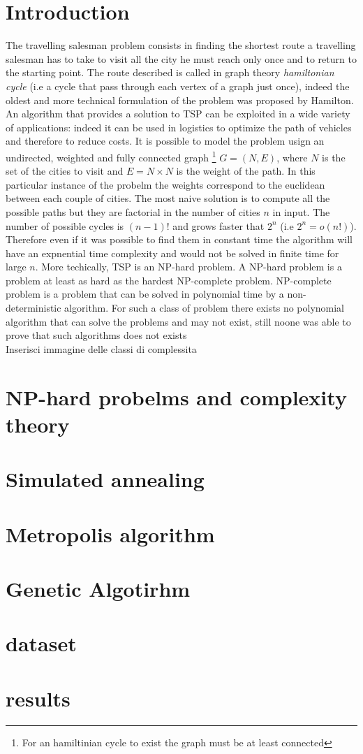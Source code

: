 \documentclass{article}
\begin{document}
\section{Introduction}
The travelling salesman problem consists in finding the shortest route a travelling salesman has to take to visit all the city he must reach only once and to return to the starting point. The route described is called in graph theory \textit{hamiltonian cycle} (i.e a cycle that pass through each vertex of a graph just once), indeed the oldest and more technical formulation of the problem was proposed by Hamilton. \\
An algorithm that provides a solution to TSP can be exploited in a wide variety of applications: indeed it can be used in logistics to optimize the path of vehicles and therefore to reduce costs.
It is possible to model the problem usign an undirected, weighted and fully connected graph \footnote{For an hamiltinian cycle to exist the graph must be at least connected} $G = (N,E)$, where $N$ is the set of the cities to visit and $E =  N \times N$ is the weight of the path. In this particular instance of the probelm the weights correspond to the euclidean between each couple of cities.
The most naive solution is to compute all the possible paths but they are factorial in the number of cities $n$ in input. The number of possible cycles is $(n-1)!$ and grows faster that $2^n$ (i.e $2^n = o(n!)$). Therefore even if it was possible to find them in constant time the algorithm will have an expnential time complexity and would not be solved in finite time for large $n$. 
More techically, TSP is an NP-hard problem. A NP-hard problem is a problem at least as hard as the hardest NP-complete problem. NP-complete problem is a problem that can be solved in polynomial time by a non-deterministic algorithm. For such a class of problem there exists no polynomial algorithm that can solve the problems and may not exist, still noone was able to prove that such algorithms does not exists
\\
Inserisci immagine delle classi di complessita
\\
\section{NP-hard probelms and complexity theory}

\section{Simulated annealing}

\section{Metropolis algorithm}

\section{Genetic Algotirhm}

\section{dataset}

\section{results}
\end{document}
